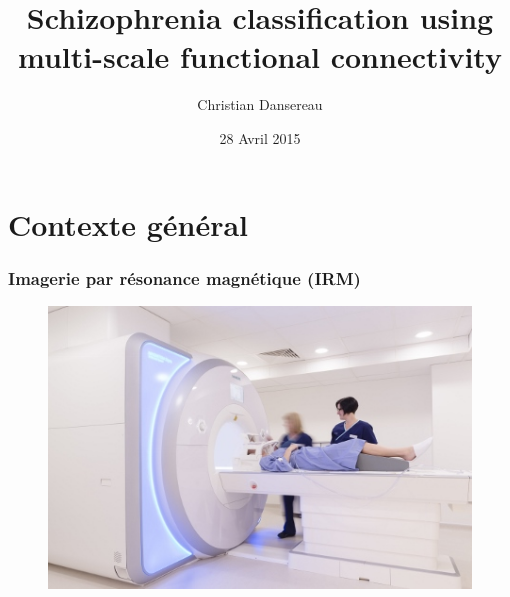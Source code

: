 \documentclass{beamer}
\title[Schizophrenia classification]{Schizophrenia classification using \\multi-scale functional connectivity } %
\author{Christian Dansereau} %
\institute[DIRO] %
{
Université de Montréal \\ %
\medskip
}
\date{28 Avril 2015} %
\begin{document}
\begin{frame}
\titlepage %
\end{frame}



\section{Contexte général} 
\frame{\sectionpage}

\begin{frame}
\frametitle{Imagerie par résonance magnétique (IRM)}
\begin{figure}
\begin{center}
\includegraphics[width=0.7\linewidth]{../figures/scanner.jpg}
\end{center}
\end{figure}
\end{frame}
\end{document}
